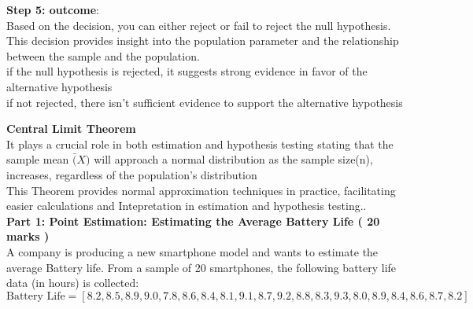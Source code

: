 \documentclass[a3paper,12pt]{extarticle} %
\begin{document}
    \subitem \textbf{Step 5: outcome}:
    \\ Based on the decision, you can either reject or fail to reject the null hypothesis. This decision provides insight into the population parameter and the relationship between the sample and the population.
    \\ if the null hypothesis is rejected, it suggests strong evidence in favor of the alternative hypothesis
    \\ if not rejected, there isn't sufficient evidence to support the alternative hypothesis

    \subitem \textbf{Central Limit Theorem}
    \\ It plays a crucial role in both estimation and hypothesis testing stating that the sample mean \(\bar(X)\) will approach a normal distribution as the sample size(n), increases, regardless of the population's distribution
    \\ This Theorem provides normal approximation techniques in practice, facilitating easier calculations and Intepretation in estimation and hypothesis testing..
    \\ \subitem \textbf{Part 1: Point Estimation: Estimating the Average Battery Life ( 20 marks )}
    \\ A company is producing a new smartphone model and wants to estimate the average Battery life. From a sample of 20 smartphones, the following battery life data (in hours) is collected:
    \[
    \text{Battery Life} = [8.2, 8.5, 8.9, 9.0, 7.8, 8.6, 8.4, 8.1, 9.1, 8.7, 9.2, 8.8, 8.3, 9.3, 8.0, 8.9, 8.4, 8.6, 8.7, 8.2]
    \]
\end{document}
